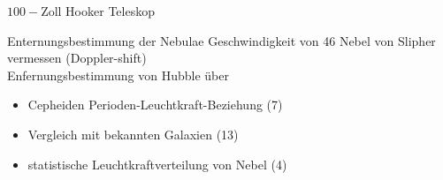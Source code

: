\documentclass[10pt, dvipsnames]{beamer}
\begin{document}
	\begin{frame}{\( 100- \)Zoll Hooker Teleskop}
	\end{frame}
	
	\begin{frame}{Enternungsbestimmung der Nebulae}
		Geschwindigkeit von 46 Nebel von Slipher vermessen (Doppler-shift) \cite{slipher1915spectrographic} \\
		Enfernungsbestimmung von Hubble über
		\begin{itemize}[label={\textendash}, itemindent=0.5cm]
			\item Cepheiden Perioden-Leuchtkraft-Beziehung (7)
			\item Vergleich mit bekannten Galaxien (13)
			\item statistische Leuchtkraftverteilung von Nebel (4)
		\end{itemize}
	\end{frame}
	
\end{document}
